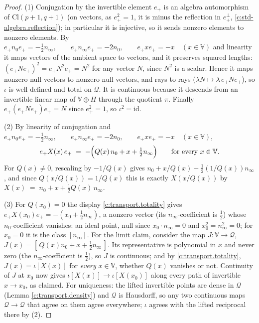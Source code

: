 \documentclass[11pt]{article}
\theoremstyle{definition}
\theoremstyle{plain}
\providecommand{\Cl}{}\renewcommand{\Cl}{\mathrm{Cl}}
\providecommand{\nInf}{}\renewcommand{\nInf}{n_\infty}
\providecommand{\nO}{}\renewcommand{\nO}{n_0}
\begin{document}
\begin{proof}
(1) Conjugation by the invertible element $e_+$ is an algebra automorphism of $\Cl(p{+}1,q{+}1)$ (on vectors, as $e_+^{2} = 1$, it is minus the reflection in $e_+^{\perp}$, \ref{c:std-algebra.reflection}); in particular it is injective, so it sends nonzero elements to nonzero elements. By $e_+ \nO e_+ = -\tfrac12 \nInf, \qquad e_+ \nInf e_+ = -2\nO, \qquad e_+ x e_+ = -x \quad (x \in \mathbb{V})$ and linearity it maps vectors of the ambient space to vectors, and it preserves squared lengths: $(e_+ N e_+)^2 = e_+ N^2 e_+ = N^2$ for any vector $N$, since $N^2$ is a scalar. Hence it maps nonzero null vectors to nonzero null vectors, and rays to rays ($\lambda N \mapsto \lambda\, e_+Ne_+$), so $\iota$ is well defined and total on $\mathcal{Q}$. It is continuous because it descends from an invertible linear map of $\mathbb{V} \oplus H$ through the quotient $\pi$. Finally $e_+ (e_+ N e_+) e_+ = N$ since $e_+^2 = 1$, so $\iota^2 = \mathrm{id}$.

(2) By linearity of conjugation and $e_+ \nO e_+ = -\tfrac12 \nInf, \qquad e_+ \nInf e_+ = -2\nO, \qquad e_+ x e_+ = -x \quad (x \in \mathbb{V})$,
\begin{equation}\label{eq:keydisplay}
e_+ X(x)\, e_+ \;=\; -\Bigl( Q(x)\,\nO + x + \tfrac12 \nInf \Bigr) \qquad \text{for every } x \in \mathbb{V}.
\end{equation}
For $Q(x) \neq 0$, rescaling by $-1/Q(x)$ gives $\nO + x/Q(x) + \tfrac12 (1/Q(x)) \nInf$, and since $Q(x/Q(x)) = 1/Q(x)$ this is exactly $X(x/Q(x))$ by $X(x) \;=\; \nO + x + \tfrac12 Q(x)\, \nInf$.

(3) For $Q(x_0) = 0$ the display \ref{c:transport.totality} gives $e_+ X(x_0) e_+ = -(x_0 + \tfrac12 \nInf)$, a nonzero vector (its $\nInf$-coefficient is $\tfrac12$) whose $\nO$-coefficient vanishes: an ideal point, null since $x_0 \cdot \nInf = 0$ and $x_0^2 = \nInf^2 = 0$; for $x_0 = 0$ it is the class $[\nInf]$. For the limit claim, consider the map $J : \mathbb{V} \to \mathcal{Q}$, $J(x) = [\,Q(x)\nO + x + \tfrac12\nInf\,]$. Its representative is polynomial in $x$ and never zero (the $\nInf$-coefficient is $\tfrac12$), so $J$ is continuous; and by \ref{c:transport.totality}, $J(x) = \iota[X(x)]$ for \emph{every} $x \in \mathbb{V}$, whether $Q(x)$ vanishes or not. Continuity of $J$ at $x_0$ now gives $\iota[X(x)] \to \iota[X(x_0)]$ along every path of invertible $x \to x_0$, as claimed. For uniqueness: the lifted invertible points are dense in $\mathcal{Q}$ (Lemma \ref{c:transport.density}) and $\mathcal{Q}$ is Hausdorff, so any two continuous maps $\mathcal{Q} \to \mathcal{Q}$ that agree on them agree everywhere; $\iota$ agrees with the lifted reciprocal there by (2).

\end{proof}
\end{document}
